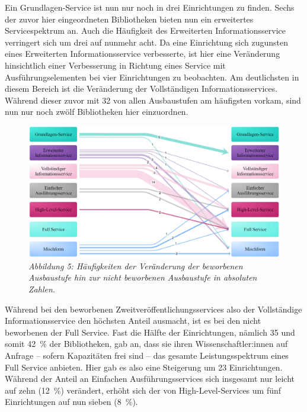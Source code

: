 \documentclass[a4paper,
fontsize=11pt,
oneside,
numbers=noperiodatend,
parskip=half-,
bibliography=totoc,
final
]{scrartcl}
\begin{document}
Ein Grundlagen-Service ist nun nur noch in drei Einrichtungen zu finden.
Sechs der zuvor hier eingeordneten Bibliotheken bieten nun ein
erweitertes Servicespektrum an. Auch die Häufigkeit des Erweiterten
Informationsservice verringert sich um drei auf nunmehr acht. Da eine
Einrichtung sich zugunsten eines Erweiterten Informationsservice
verbesserte, ist hier eine Veränderung hinsichtlich einer Verbesserung
in Richtung eines Service mit Ausführungselementen bei vier
Einrichtungen zu beobachten. Am deutlichsten in diesem Bereich ist die
Veränderung der Vollständigen Informationsservices. Während dieser zuvor
mit 32 von allen Ausbaustufen am häufigsten vorkam, sind nun nur noch zwölf
Bibliotheken hier einzuordnen.

\begin{figure}[h!]
\centering
\includegraphics[width=.9\textwidth]{img/abb5.png}
\caption[Abbildung 5: Häufigkeiten der Veränderung der beworbenen
Ausbaustufe hin zur nicht beworbenen Ausbaustufe in absoluten
Zahlen.]{\textit{Abbildung 5: Häufigkeiten der Veränderung der beworbenen
Ausbaustufe hin zur nicht beworbenen Ausbaustufe in absoluten
Zahlen.}\footnotemark{}}
\end{figure}


Während bei den beworbenen Zweitveröffentlichungsservices also der
Vollständige Informationsservice den höchsten Anteil ausmacht, ist es
bei den nicht beworbenen der Full Service. Fast die Hälfte der
Einrichtungen, nämlich 35 und somit 42~\% der Bibliotheken, gab an, dass
sie ihren Wissenschaftler:innen auf Anfrage -- sofern Kapazitäten frei
sind -- das gesamte Leistungsspektrum eines Full Service anbieten. Hier
gab es also eine Steigerung um 23 Einrichtungen. Während der Anteil an
Einfachen Ausführungsservices sich insgesamt nur leicht auf zehn (12~\%)
verändert, erhöht sich der von High-Level-Services um fünf Einrichtungen
auf nun sieben (8~\%).
\end{document}
